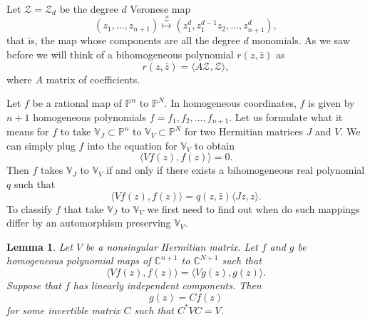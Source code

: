 \documentclass[12pt,openany]{book}
\newcommand{\C}{{\mathbb{C}}}
\newcommand{\bP}{{\mathbb{P}}}
\newcommand{\bV}{{\mathbb{V}}}
\newcommand{\sZ}{{\mathcal{Z}}}
\theoremstyle{plain}
\newtheorem{lemma}[thm]{Lemma}
\theoremstyle{remark}
\theoremstyle{definition}
\theoremstyle{exercise}
\theoremstyle{example}
\begin{document}
Let $\sZ = \sZ_d$ be the degree $d$ Veronese map
\begin{equation}
(z_1,\ldots,z_{n+1}) \overset{\sZ}{\mapsto}
(z_1^d,z_1^{d-1}z_2,\ldots,z_{n+1}^d),
\end{equation}
that is, the map
whose components are all the degree $d$ monomials.
As we saw before we will think of a bihomogeneous polynomial
$r(z,\bar{z})$ as
\begin{equation}
r(z,\bar{z}) = \langle A \sZ, \sZ \rangle ,
\end{equation}
where $A$
matrix of coefficients.

Let $f$ be
a rational map of $\bP^{n}$ to $\bP^{N}$.  In
homogeneous coordinates, $f$ is given by
$n+1$ homogeneous polynomials $f = f_1,f_2,\ldots,f_{n+1}$.
Let us
formulate what it means for $f$ to take
$\bV_J \subset \bP^{n}$ to $\bV_V \subset \bP^{N}$ for 
two Hermitian matrices $J$ and $V$.
We can simply plug $f$ into the equation for $\bV_V$ to obtain
\begin{equation}
\langle V f(z) , f(z) \rangle = 0 .
\end{equation}
Then $f$ takes
$\bV_J$ to $\bV_V$ if and only if there exists a bihomogeneous real
polynomial $q$ such that
\begin{equation}
\langle V f(z) , f(z) \rangle = q(z,\bar{z}) \langle J z , z \rangle .
\end{equation}
To classify $f$ that take $\bV_J$ to $\bV_V$
we first need to find out when do such mappings differ by an automorphism
preserving $\bV_V$.

\begin{lemma} \label{formprop}
Let $V$ be a nonsingular Hermitian matrix.  Let $f$ and $g$ be homogeneous
polynomial maps of $\C^{n+1}$ to $\C^{N+1}$ such that
\begin{equation}
\langle V f(z) , f(z) \rangle = \langle V g(z) , g(z) \rangle .
\end{equation}
Suppose that $f$ has linearly independent components.
Then
\begin{equation}
g(z) = C f(z)
\end{equation}
for some invertible matrix $C$ such that $C^* V C = V$.
\end{lemma}
\end{document}
